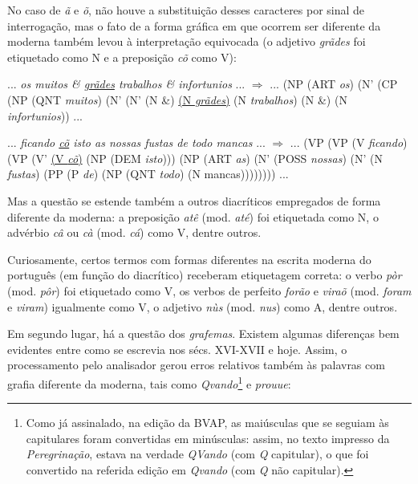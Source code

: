 \documentclass[portuguese]{textolivre}
\begin{document}
No caso de \textit{ã} e \textit{õ}, não houve a substituição desses caracteres por sinal de interrogação, mas o fato de a forma gráfica em que ocorrem ser diferente da moderna também levou à interpretação equivocada (o adjetivo \textit{grãdes} foi etiquetado como N e a preposição \textit{cõ} como V):

\begin{description}[topsep=10pt, parsep=2pt, itemindent=!]
\item[(04)\label{04}] 
... \textit{os muitos \& \uline{grãdes} trabalhos \& infortunios} ... $\Rightarrow$ ... (NP (ART \textit{os}) (N' (CP (NP (QNT \textit{muitos}) (N' (N' (N \&) \uline{(N \textit{grãdes})} (N \textit{trabalhos}) (N \&) (N \textit{infortunios})) ...

\item[(05)\label{05}] 
... \textit{ficando \uline{cõ} isto as nossas fustas de todo mancas} ... $\Rightarrow$ ... (VP (VP (V \textit{ficando}) (VP (V' \uline{(V \textit{cõ})} (NP (DEM \textit{isto}))) (NP (ART \textit{as}) (N' (POSS \textit{nossas}) (N' (N \textit{fustas}) (PP (P \textit{de}) (NP (QNT \textit{todo}) (N \textnormal{mancas})))))))) ...
\end{description}


Mas a questão se estende também a outros diacríticos empregados de forma diferente da moderna: a preposição \textit{atê} (mod. \textit{até}) foi etiquetada como N, o advérbio \textit{câ} ou \textit{cà} (mod. \textit{cá}) como V, dentre outros.

Curiosamente, certos termos com formas diferentes na escrita moderna do português (em função do diacrítico) receberam etiquetagem correta: o verbo \textit{pòr} (mod. \textit{pôr}) foi etiquetado como V, os verbos de perfeito \textit{forão} e \textit{viraõ} (mod. \textit{foram} e \textit{viram}) igualmente como V, o adjetivo \textit{nùs} (mod. \textit{nus}) como A, dentre outros.

Em segundo lugar, há a questão dos \textit{grafemas}. Existem algumas diferenças bem evidentes entre como se escrevia nos sécs. XVI-XVII e hoje. Assim, o processamento pelo analisador gerou erros relativos também às palavras com grafia diferente da moderna, tais como \textit{Qvando}\footnote{Como já assinalado, na edição da BVAP, as maiúsculas que se seguiam às capitulares foram convertidas em minúsculas: assim, no texto impresso da \textit{Peregrinação}, estava na verdade \textit{QVando} (com \textit{Q} capitular), o que foi convertido na referida edição em \textit{Qvando} (com \textit{Q} não capitular).} e \textit{prouue}:
\end{document}
